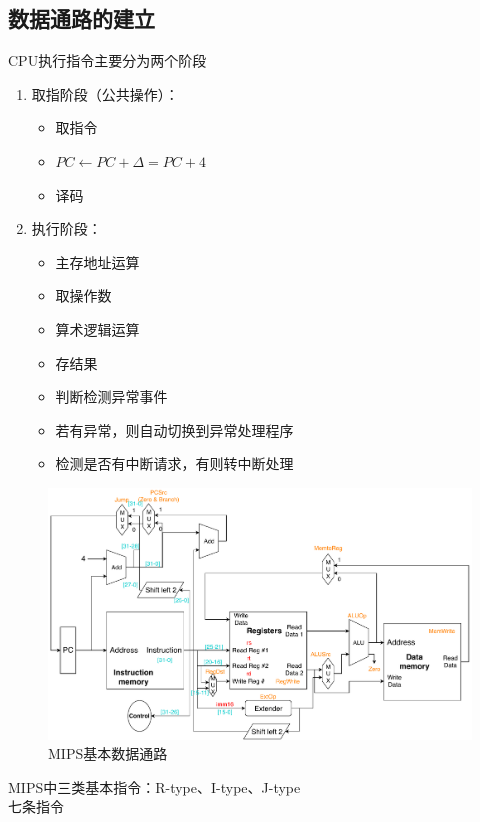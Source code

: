 \subsection{数据通路的建立}
CPU执行指令主要分为两个阶段
\begin{enumerate}
	\item 取指阶段（公共操作）：
	\begin{itemize}
		\item 取指令
		\item $PC\gets PC+\Delta=PC+4$
		\item 译码
	\end{itemize}
	\item 执行阶段：
	\begin{itemize}
		\item 主存地址运算
		\item 取操作数
		\item 算术逻辑运算
		\item 存结果
		\item 判断检测异常事件
		\item 若有异常，则自动切换到异常处理程序
		\item 检测是否有中断请求，有则转中断处理
	\end{itemize}
\end{enumerate}
\begin{figure}[htbp]
\centering
\includegraphics[width=\linewidth]{fig/Datapath_All.pdf}
\caption{MIPS基本数据通路}
\end{figure}
MIPS中三类基本指令：R-type、I-type、J-type\\
七条指令
